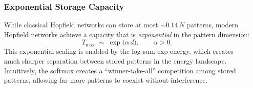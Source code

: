 \subsubsection*{Exponential Storage Capacity}

While classical Hopfield networks can store at most $\sim 0.14\,N$ patterns, modern Hopfield networks achieve a capacity that is \emph{exponential} in the pattern dimension:
\begin{equation}
    T_{\max} \;\sim\; \exp\!\bigl(\alpha\, d\bigr), \qquad \alpha > 0.
\end{equation}
This exponential scaling is enabled by the log-sum-exp energy, which creates much sharper separation between stored patterns in the energy landscape.
Intuitively, the softmax creates a ``winner-take-all'' competition among stored patterns, allowing far more patterns to coexist without interference.

